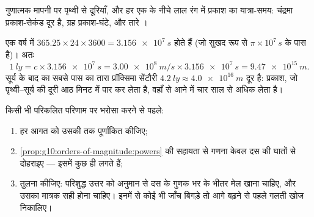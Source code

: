 \begin{omfigure}

{\small गुणात्मक मापनी पर पृथ्वी से दूरियाँ, और हर एक के नीचे लाल रंग
में प्रकाश का यात्रा-समय: चंद्रमा प्रकाश-सेकंड दूर है, ग्रह
प्रकाश-घंटे, और तारे ।}
\end{omfigure}

\begin{example}[प्रकाश वर्ष, मीटरों में]\label{ex:g10:orders-of-magnitude:ly}
एक वर्ष में $365.25 \times 24 \times 3600 = \qty{3.156e7}{s}$ होते हैं (जो सुखद रूप से $\pi \times 10^{7}\,\unit{s}$ के पास है)। अतः
\[
\qty{1}{ly} = c \times \qty{3.156e7}{s}
= \qty{3.00e8}{m/s} \times \qty{3.156e7}{s}
= \qty{9.47e15}{m}.
\]
सूर्य के बाद का सबसे पास का तारा प्रॉक्सिमा सेंटौरी $\qty{4.2}{ly} \approx \qty{4.0e16}{m}$ दूर है:
प्रकाश, जो पृथ्वी--सूर्य की दूरी आठ मिनट में पार कर लेता है, वहाँ से आने
में चार साल से अधिक लेता है।
\end{example}

\begin{method}[परिमाण की कोटि से जाँच]\label{met:g10:orders-of-magnitude:sanity}
किसी भी परिकलित परिणाम पर भरोसा करने से पहले:
\begin{enumerate}
  \item हर आगत को उसकी  तक पूर्णांकित कीजिए;
  \item \cref{prop:g10:orders-of-magnitude:powers} की सहायता से गणना केवल दस की घातों से दोहराइए ---
        इसमें कुछ ही  लगते हैं;
  \item तुलना कीजिए: परिशुद्ध उत्तर को अनुमान से दस के गुणक भर के भीतर
        मेल खाना चाहिए, और उसका मात्रक सही होना चाहिए। इनमें
        से कोई भी जाँच बिगड़े तो आगे बढ़ने से पहले गलती खोज निकालिए।
\end{enumerate}
\end{method}

